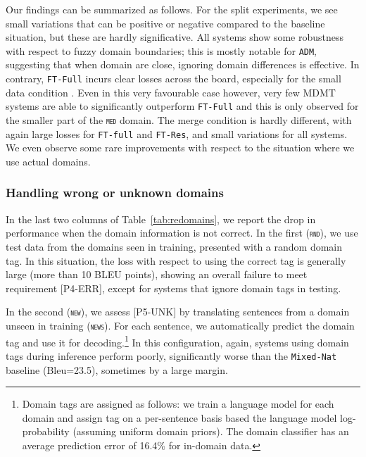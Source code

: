 \documentclass[11pt,a4paper]{article}
\newcommand{\fyDone}[1]{\done[FY]\Todo[FY:]{\textcolor{orange}{#1}}}
\newcommand{\revision}[1]{#1}
\newcommand{\domain}[1]{\texttt{\textsc{#1}}}
\newcommand{\system}[1]{\texttt{{#1}}}
\begin{document}
Our findings can be summarized as follows. For the split experiments, we see small variations that can be positive or negative compared to the baseline situation, but these are hardly significative. All systems show some robustness with respect to fuzzy domain boundaries; this is mostly notable for \system{ADM}, suggesting that when domain are close, ignoring domain differences is effective. In contrary, \system{FT-Full} incurs clear losses across the board, especially for the small data condition \cite{Miceli-barone17regularization}. Even in this very favourable case however, very few MDMT systems are able to significantly outperform \system{FT-Full} and this is only observed for the smaller part of the \domain{med} domain. The merge condition is hardly different, with again large losses for \system{FT-full} \revision{and \system{FT-Res}}, and small variations for all systems. We even observe some rare improvements with respect to the situation where we use actual domains.\fyDone{More comments ?}

\subsubsection{Handling wrong or unknown domains \label{sssec:unknowns}}

\fyDone{Numbers for the rand domain analysis}In the last two columns of Table~\ref{tab:redomains}, we report the drop in performance when the domain information is not correct. In the first (\domain{rnd}), we use test data from the domains seen in training, presented with a random domain tag\fyDone{all configs use the same tag or is randomization is run for each config}. In this situation, the loss with respect to using the correct tag is generally large (more than 10 BLEU points), showing an overall failure to meet requirement [P4-ERR], except for systems that ignore domain tags in testing. \fyDone{Comments?}

In the second (\domain{new}), we assess [P5-UNK] by translating sentences from a domain unseen in training (\domain{news}).\fyDone{i would use RND / UNK rather than OLD / NEW} For each sentence, we automatically predict the domain tag and use it for decoding.\footnote{\revision{Domain tags are assigned as follows: we train a language model for each domain and assign tag on a per-sentence basis based the language model log-probability (assuming uniform domain priors). The domain classifier has an average prediction error of 16.4\% for in-domain data.}}
In this configuration, again, systems using domain tags during inference perform poorly, significantly worse than the \system{Mixed-Nat} baseline (Bleu=23.5)\fyDone{performance drop is now measured against Mixed-nat (leave it clearer?)}, sometimes by a large margin.\fyDone{Check significance, To be completed}
\end{document}
